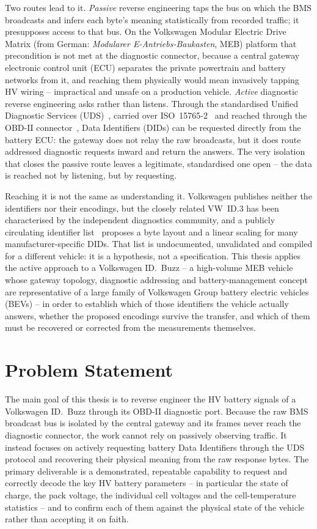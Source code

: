 \documentclass[11pt,a4paper,oneside,parskip=half]{scrreprt}
\begin{document}
Two routes lead to it. \textit{Passive} reverse engineering taps the bus on which the BMS broadcasts and infers each byte's meaning statistically from recorded traffic; it presupposes access to that bus. On the Volkswagen Modular Electric Drive Matrix (from German: \textit{Modularer E-Antriebs-Baukasten}, MEB) platform that precondition is not met at the diagnostic connector, because a central gateway electronic control unit (ECU) separates the private powertrain and battery networks from it, and reaching them physically would mean invasively tapping HV wiring -- impractical and unsafe on a production vehicle. \textit{Active} diagnostic reverse engineering asks rather than listens. Through the standardised Unified Diagnostic Services (UDS)~\cite{iso14229}, carried over ISO~15765-2~\cite{iso15765} and reached through the OBD-II connector~\cite{saej1962}, Data Identifiers (DIDs) can be requested directly from the battery ECU: the gateway does not relay the raw broadcasts, but it does route addressed diagnostic requests inward and return the answers. The very isolation that closes the passive route leaves a legitimate, standardised one open -- the data is reached not by listening, but by requesting.

Reaching it is not the same as understanding it. Volkswagen publishes neither the identifiers nor their encodings, but the closely related VW~ID.3 has been characterised by the independent diagnostics community, and a publicly circulating identifier list~\cite{vwmebpidlist} proposes a byte layout and a linear scaling for many manufacturer-specific DIDs. That list is undocumented, unvalidated and compiled for a different vehicle: it is a hypothesis, not a specification. This thesis applies the active approach to a Volkswagen ID.~Buzz -- a high-volume MEB vehicle whose gateway topology, diagnostic addressing and battery-management concept are representative of a large family of Volkswagen Group battery electric vehicles (BEVs) -- in order to establish which of those identifiers the vehicle actually answers, whether the proposed encodings survive the transfer, and which of them must be recovered or corrected from the measurements themselves.

\section{Problem Statement}
\label{sec:problem}
The main goal of this thesis is to reverse engineer the HV battery signals of a Volkswagen ID.~Buzz through its OBD-II diagnostic port. Because the raw BMS broadcast bus is isolated by the central gateway and its frames never reach the diagnostic connector, the work cannot rely on passively observing traffic. It instead focuses on actively requesting battery Data Identifiers through the UDS protocol and recovering their physical meaning from the raw response bytes. The primary deliverable is a demonstrated, repeatable capability to request and correctly decode the key HV battery parameters -- in particular the state of charge, the pack voltage, the individual cell voltages and the cell-temperature statistics -- and to confirm each of them against the physical state of the vehicle rather than accepting it on faith.
\end{document}
